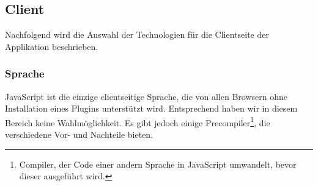 	\subsection{Client}
		Nachfolgend wird die Auswahl der Technologien für die Clientseite der Applikation beschrieben.

		\subsubsection{Sprache}
		JavaScript ist die einzige clientseitige Sprache, die von allen Browsern ohne Installation eines Plugins unterstützt wird. Entsprechend haben wir in diesem Bereich keine Wahlmöglichkeit. Es gibt jedoch einige Precompiler\footnote{Compiler, der Code einer andern Sprache in JavaScript umwandelt, bevor dieser ausgeführt wird.}, die verschiedene Vor- und Nachteile bieten.

